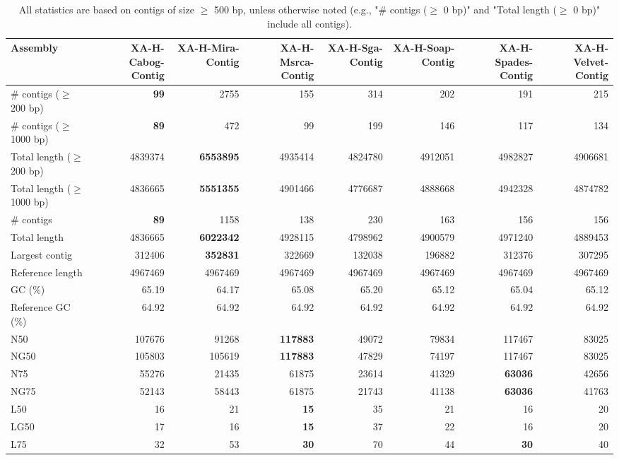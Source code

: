 \documentclass[12pt,a4paper]{article}
\begin{document}
\begin{table}[ht]
\begin{center}
\caption{All statistics are based on contigs of size $\geq$ 500 bp, unless otherwise noted (e.g., "\# contigs ($\geq$ 0 bp)" and "Total length ($\geq$ 0 bp)" include all contigs).}
\begin{tabular}{|l*{7}{|r}|}
\hline
Assembly & XA-H-Cabog-Contig & XA-H-Mira-Contig & XA-H-Msrca-Contig & XA-H-Sga-Contig & XA-H-Soap-Contig & XA-H-Spades-Contig & XA-H-Velvet-Contig \\ \hline
\# contigs ($\geq$ 200 bp) & {\bf 99} & 2755 & 155 & 314 & 202 & 191 & 215 \\ \hline
\# contigs ($\geq$ 1000 bp) & {\bf 89} & 472 & 99 & 199 & 146 & 117 & 134 \\ \hline
Total length ($\geq$ 200 bp) & 4839374 & {\bf 6553895} & 4935414 & 4824780 & 4912051 & 4982827 & 4906681 \\ \hline
Total length ($\geq$ 1000 bp) & 4836665 & {\bf 5551355} & 4901466 & 4776687 & 4888668 & 4942328 & 4874782 \\ \hline
\# contigs & {\bf 89} & 1158 & 138 & 230 & 163 & 156 & 156 \\ \hline
Total length & 4836665 & {\bf 6022342} & 4928115 & 4798962 & 4900579 & 4971240 & 4889453 \\ \hline
Largest contig & 312406 & {\bf 352831} & 322669 & 132038 & 196882 & 312376 & 307295 \\ \hline
Reference length & 4967469 & 4967469 & 4967469 & 4967469 & 4967469 & 4967469 & 4967469 \\ \hline
GC (\%) & 65.19 & 64.17 & 65.08 & 65.20 & 65.12 & 65.04 & 65.12 \\ \hline
Reference GC (\%) & 64.92 & 64.92 & 64.92 & 64.92 & 64.92 & 64.92 & 64.92 \\ \hline
N50 & 107676 & 91268 & {\bf 117883} & 49072 & 79834 & 117467 & 83025 \\ \hline
NG50 & 105803 & 105619 & {\bf 117883} & 47829 & 74197 & 117467 & 83025 \\ \hline
N75 & 55276 & 21435 & 61875 & 23614 & 41329 & {\bf 63036} & 42656 \\ \hline
NG75 & 52143 & 58443 & 61875 & 21743 & 41138 & {\bf 63036} & 41763 \\ \hline
L50 & 16 & 21 & {\bf 15} & 35 & 21 & 16 & 20 \\ \hline
LG50 & 17 & 16 & {\bf 15} & 37 & 22 & 16 & 20 \\ \hline
L75 & 32 & 53 & {\bf 30} & 70 & 44 & {\bf 30} & 40 \\ \hline

\end{tabular}
\end{center}
\end{table}
\end{document}

